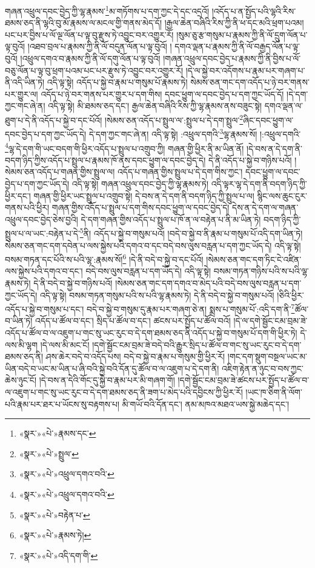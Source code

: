 གཞན་འཕྲུལ་དབང་བྱེད་ཀྱི་ལྷ་རྣམས་\footnote{«སྣར་»«པེ་»རྣམས་དང་}མ་གཏོགས་པ་དག་ཀྱང་དེ་དང་འདྲའོ། །འདོད་པ་ན་སྤྱོད་པའི་ལྷའི་རིས་ཐམས་ཅད་ནི་ལྷའི་བུ་མོ་རྣམས་ལ་མངལ་གྱི་གནས་མེད་དོ། །རྒྱལ་ཆེན་བཞིའི་རིས་ཀྱི་ནི་ཕ་དང་མའི་ཕྲག་པའམ། པང་པར་བྱིས་པ་ལོ་ལྔ་ལོན་པ་ལྟ་བུ་རྫུས་ཏེ་འབྱུང་བར་འགྱུར་རོ། །སུམ་ཅུ་རྩ་གསུམ་པ་རྣམས་ཀྱི་ནི་ལོ་དྲུག་ལོན་པ་ལྟ་བུའོ། །འཐབ་བྲལ་པ་རྣམས་ཀྱི་ནི་ལོ་བདུན་ལོན་པ་ལྟ་བུའོ། །
དགའ་ལྡན་པ་རྣམས་ཀྱི་ནི་ལོ་བརྒྱད་ལོན་པ་ལྟ་བུའོ། །འཕྲུལ་དགའ་བ་རྣམས་ཀྱི་ནི་ལོ་དགུ་ལོན་པ་ལྟ་བུའོ། །གཞན་འཕྲུལ་དབང་བྱེད་པ་རྣམས་ཀྱི་ནི་བྱིས་པ་ལོ་བཅུ་ལོན་པ་ལྟ་བུ་ཕྲག་པའམ་པང་པར་རྫུས་ཏེ་འབྱུང་བར་འགྱུར་རོ། །དེ་ལ་སྐྱེ་བར་འདོགས་པ་རྣམ་པར་གཞག་པ་ནི་འདི་ཡིན་ཏེ། འདི་ལྟ་སྟེ། འདོད་པ་སྐྱེ་བ་རྣམ་པ་གསུམ་པོ་རྣམས་ཏེ། སེམས་ཅན་གང་དག་འདོད་པ་ཉེ་བར་གནས་པར་གྱུར་ལ། འདོད་པ་ཉེ་བར་གནས་པར་གྱུར་པ་དག་གིས། དབང་ཕྱུག་ལ་དབང་བྱེད་པ་དག་ཀྱང་ཡོད་དོ། །དེ་དག་ཀྱང་གང་ཞེ་ན། འདི་ལྟ་སྟེ། མི་ཐམས་ཅད་དང་། རྒྱལ་ཆེན་བཞིའི་རིས་ཀྱི་ལྷ་རྣམས་ནས་བཟུང་སྟེ། དགའ་ལྡན་ལ་ཐུག་པ་དེ་ནི་འདོད་པ་སྐྱེ་བ་དང་པོའོ། །སེམས་ཅན་འདོད་པ་སྤྲུལ་ལ་:སྤྲུལ་པ་དེ་དག་སྤྲུལ་\footnote{«སྣར་»«པེ་»སྤྲུལ་}ཞིང་དབང་ཕྱུག་ལ་དབང་བྱེད་པ་དག་ཀྱང་ཡོད་དེ། དེ་དག་ཀྱང་གང་ཞེ་ན། འདི་ལྟ་སྟེ། :འཕྲུལ་དགའི་\footnote{«སྣར་»«པེ་»འཕྲུལ་དགའ་བའི་}ལྷ་རྣམས་སོ། །:འཕྲུལ་དགའི་\footnote{«སྣར་»«པེ་»འཕྲུལ་དགའ་བའི་}ལྷ་དེ་དག་གི་ཡང་བདག་གི་ཕྱིར་འདོད་པ་སྤྲུལ་པ་འགྲུབ་ཀྱི། གཞན་གྱི་ཕྱིར་ནི་མ་ཡིན་ནོ། །དེ་བས་ན་དེ་དག་ནི་བདག་ཉིད་ཀྱིས་འདོད་པ་སྤྲུལ་པ་རྣམས་ཁོ་ནས་དབང་ཕྱུག་ལ་དབང་བྱེད་དེ། དེ་ནི་འདོད་པ་སྐྱེ་བ་གཉིས་པའོ། །སེམས་ཅན་འདོད་པ་གཞན་གྱིས་སྤྲུལ་ལ། འདོད་པ་གཞན་གྱིས་སྤྲུལ་པ་དེ་དག་གིས་ཀྱང་། དབང་ཕྱུག་ལ་དབང་བྱེད་པ་དག་ཀྱང་ཡོད་དེ། འདི་ལྟ་སྟེ། གཞན་འཕྲུལ་དབང་བྱེད་ཀྱི་ལྷ་རྣམས་ཏེ། འདི་ལྟར་ལྷ་དེ་དག་ནི་བདག་ཉིད་ཀྱི་ཕྱིར་དང་། གཞན་གྱི་ཕྱིར་ཡང་སྤྲུལ་པ་འགྲུབ་སྟེ། དེ་བས་ན་དེ་དག་ནི་བདག་ཉིད་ཀྱི་སྤྲུལ་པ་ལ། སྙིང་ལས་ཆུང་ངུར་གནས་པའི་ཕྱིར། གཞན་གྱིས་འདོད་པ་སྤྲུལ་པ་དག་གིས་དབང་ཕྱུག་ལ་དབང་བྱེད་དེ། དེས་ན་དེ་དག་ལ་གཞན་འཕྲུལ་དབང་བྱེད་ཅེས་བྱའི། དེ་དག་གཞན་གྱིས་འདོད་པ་སྤྲུལ་པ་ཁོ་ན་ལ་བརྟེན་པ་ནི་མ་ཡིན་ཏེ། བདག་ཉིད་ཀྱི་སྤྲུལ་པ་ལ་ཡང་:བརྟེན་པ་དེ་\footnote{«སྣར་»«པེ་»བརྟེན་པ་}ནི། འདོད་པ་སྐྱེ་བ་གསུམ་པའོ། །བདེ་བ་སྐྱེ་བ་ནི་རྣམ་པ་གསུམ་པོ་འདི་དག་ཡིན་ཏེ། སེམས་ཅན་གང་དག་དབེན་པ་ལས་སྐྱེས་པའི་དགའ་བ་དང་བདེ་བས་ལུས་བརླན་པ་དག་ཀྱང་ཡོད་དེ། འདི་ལྟ་སྟེ། བསམ་གཏན་དང་པོའི་ས་པའི་ལྷ་:རྣམས་སོ།\footnote{«སྣར་»«པེ་»རྣམས་ཏེ།} །དེ་ནི་བདེ་བ་སྐྱེ་བ་དང་པོའོ། །སེམས་ཅན་གང་དག་ཏིང་ངེ་འཛིན་ལས་སྐྱེས་པའི་དགའ་བ་དང་། བདེ་བས་ལུས་བརླན་པ་དག་ཡོད་དེ། འདི་ལྟ་སྟེ། བསམ་གཏན་གཉིས་པའི་ས་པའི་ལྷ་རྣམས་ཏེ། དེ་ནི་བདེ་བ་སྐྱེ་བ་གཉིས་པའོ། །སེམས་ཅན་གང་དག་དགའ་བ་མེད་པའི་བདེ་བས་ལུས་བརླན་པ་དག་ཀྱང་ཡོད་དེ། འདི་ལྟ་སྟེ། བསམ་གཏན་གསུམ་པའི་ས་པའི་ལྷ་རྣམས་ཏེ། དེ་ནི་བདེ་བ་སྐྱེ་བ་གསུམ་པའོ། །ཅིའི་ཕྱིར་འདོད་པ་སྐྱེ་བ་གསུམ་པ་དང་། བདེ་བ་སྐྱེ་བ་གསུམ་དུ་རྣམ་པར་གཞག་ཅེ་ན། སྨྲས་པ་གསུམ་པོ་:འདི་དག་ནི་\footnote{«སྣར་»«པེ་»འདི་དག་གི་}ཚོལ་བ་ཡིན་ཏེ། འདོད་པ་ཚོལ་བ་དང་། སྲིད་པ་ཚོལ་བ་དང་། ཚངས་པར་སྤྱོད་པ་ཚོལ་བའོ། །དེ་ལ་དགེ་སྦྱོང་ངམ་བྲམ་ཟེ་འདོད་པ་ཚོལ་བ་ལ་འཇུག་པ་གང་སུ་ཡང་རུང་བ་དེ་དག་ཐམས་ཅད་ནི་འདོད་པ་སྐྱེ་བ་གསུམ་པོ་དག་གི་ཕྱིར་ཏེ། དེ་ལས་མི་ལྷག །དེ་ལས་མི་མང་ངོ། །དགེ་སྦྱོང་ངམ་བྲམ་ཟེ་བདེ་བའི་རྒྱུར་སྲིད་པ་ཚོལ་བ་གང་སུ་ཡང་རུང་བ་དེ་དག་ཐམས་ཅད་ནི། ཤས་ཆེར་བདེ་བ་འདོད་པས། བདེ་བ་སྐྱེ་བ་རྣམ་པ་གསུམ་གྱི་ཕྱིར་རོ། །གང་དག་སྡུག་བསྔལ་ཡང་མ་ཡིན་བདེ་བ་ཡང་མ་ཡིན་པ་ཞི་བའི་སྐྱེ་བའི་དོན་དུ་ཚོལ་བ་ལ་འཇུག་པ་དེ་དག་ནི། འཇིག་རྟེན་ན་ཉུང་བ་བས་ཀྱང་ཆེས་ཉུང་ངོ། །དེ་བས་ན་དེའི་གོང་དུ་སྐྱེ་བ་རྣམ་པར་མི་གཞག་གོ། །དགེ་སྦྱོང་ངམ་བྲམ་ཟེ་ཚངས་པར་སྤྱོད་པ་ཚོལ་བ་ལ་འཇུག་པ་གང་སུ་ཡང་རུང་བ་དེ་དག་ཐམས་ཅད་ནི་ཟག་པ་མེད་པའི་དབྱིངས་ཀྱི་ཕྱིར་རོ། །ཡང་ཁ་ཅིག་ནི་ལོག་པའི་རྣམ་པར་ཐར་པ་ཡོངས་སུ་བརྟགས་པ། མི་གཡོ་བའི་དོན་དང་། ནམ་མཁའ་མཐའ་ཡས་སྐྱེ་མཆེད་དང་། 